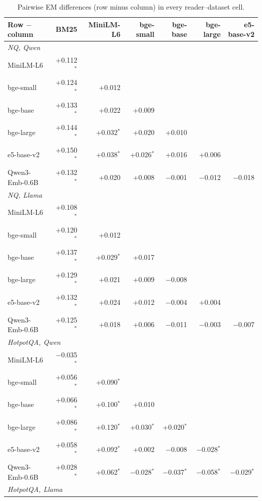 \begin{table}[t]
\centering
\small
\caption{Pairwise EM differences (row minus column) in every reader--dataset cell.}
\label{tab:pairwise}
\begin{tabular}{lrrrrrr}
\toprule
Row $-$ column & BM25 & MiniLM-L6 & bge-small & bge-base & bge-large & e5-base-v2 \\
\midrule
\multicolumn{7}{l}{\emph{NQ, Qwen}} \\
MiniLM-L6 & +0.112$^{*}$ &  &  &  &  &  \\
bge-small & +0.124$^{*}$ & +0.012 &  &  &  &  \\
bge-base & +0.133$^{*}$ & +0.022 & +0.009 &  &  &  \\
bge-large & +0.144$^{*}$ & +0.032$^{*}$ & +0.020 & +0.010 &  &  \\
e5-base-v2 & +0.150$^{*}$ & +0.038$^{*}$ & +0.026$^{*}$ & +0.016 & +0.006 &  \\
Qwen3-Emb-0.6B & +0.132$^{*}$ & +0.020 & +0.008 & $-$0.001 & $-$0.012 & $-$0.018 \\
\multicolumn{7}{l}{\emph{NQ, Llama}} \\
MiniLM-L6 & +0.108$^{*}$ &  &  &  &  &  \\
bge-small & +0.120$^{*}$ & +0.012 &  &  &  &  \\
bge-base & +0.137$^{*}$ & +0.029$^{*}$ & +0.017 &  &  &  \\
bge-large & +0.129$^{*}$ & +0.021 & +0.009 & $-$0.008 &  &  \\
e5-base-v2 & +0.132$^{*}$ & +0.024 & +0.012 & $-$0.004 & +0.004 &  \\
Qwen3-Emb-0.6B & +0.125$^{*}$ & +0.018 & +0.006 & $-$0.011 & $-$0.003 & $-$0.007 \\
\multicolumn{7}{l}{\emph{HotpotQA, Qwen}} \\
MiniLM-L6 & $-$0.035$^{*}$ &  &  &  &  &  \\
bge-small & +0.056$^{*}$ & +0.090$^{*}$ &  &  &  &  \\
bge-base & +0.066$^{*}$ & +0.100$^{*}$ & +0.010 &  &  &  \\
bge-large & +0.086$^{*}$ & +0.120$^{*}$ & +0.030$^{*}$ & +0.020$^{*}$ &  &  \\
e5-base-v2 & +0.058$^{*}$ & +0.092$^{*}$ & +0.002 & $-$0.008 & $-$0.028$^{*}$ &  \\
Qwen3-Emb-0.6B & +0.028$^{*}$ & +0.062$^{*}$ & $-$0.028$^{*}$ & $-$0.037$^{*}$ & $-$0.058$^{*}$ & $-$0.029$^{*}$ \\
\multicolumn{7}{l}{\emph{HotpotQA, Llama}} \\

\end{tabular}
\end{table}
